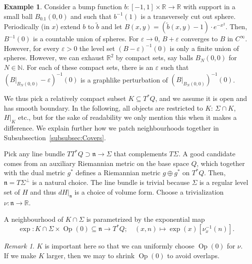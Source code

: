 \documentclass{amsart}
\newcommand{\NN}{\mathbb{N}}
\newcommand{\RR}{\mathbb{R}}
\newcommand{\Op}{\operatorname{Op}}
\theoremstyle{definition}
\newtheorem{example}[proposition]{Example}
\theoremstyle{remark}
\newtheorem{remark}[proposition]{Remark}
\numberwithin{equation}{section}
\begin{document}
\begin{example}\label{ex:InfiniteSpheres}
    Consider a bump function $b:[-1,1]\times \RR \to\RR$ with support in a small ball $B_{0.1}(0,0)$ and such that $b^{-1}(1)$ is a transversely cut out sphere. Periodically (in $x$) extend $b$ to $\tilde b$ and let $B(x,y)=(\tilde b(x,y)-1)\cdot e^{-x^2}$. Then, $B^{-1}(0)$ is a countable union of spheres. For $\varepsilon\to 0$, $B+\varepsilon$ converges to $B$ in $C^\infty$. However, for every $\varepsilon>0$ the level set $(B-\varepsilon)^{-1}(0)$ is only a finite union of spheres. However, we can exhaust $\RR^2$ by compact sets, say balls $B_N(0,0)$ for $N\in \NN$. For each of these compact sets, there is an $\varepsilon$ such that $(B|_{B_N(0,0)}-\varepsilon)^{-1}(0)$ is a graphlike perturbation of $(B|_{B_N(0,0)})^{-1}(0)$. 
\end{example}

We thus pick a relatively compact subset $K\subseteq T^*Q$, and we assume it is open and has smooth boundary. In the following, all objects are restricted to $K$: $\Sigma\cap K$, $H|_K$ etc., but for the sake of readability we only mention this when it makes a difference. We explain further how we patch neighbourhoods together in Subsubsection~\ref{subsubsec:Covers}.

Pick any line bundle $TT^*Q\supset\mathfrak n\to \Sigma$ that complements $T\Sigma$. A good candidate comes from an auxiliary Riemannian metric on the base space $Q$, which together with the dual metric $g^*$ defines a Riemannian metric $g\oplus g^*$ on $T^*Q$. Then, $\mathfrak n=T\Sigma^\perp$ is a natural choice. The line bundle is trivial because $\Sigma$ is a regular level set of $H$ and thus $dH|_{\mathfrak n}$ is a choice of volume form. Choose a trivialization $\nu:\mathfrak n\to \RR$. 

A neighbourhood of $K\cap\Sigma$ is parametrized by the exponential map
$$\exp: K\cap\Sigma\times \Op(0)\subseteq \mathfrak n \to T^*Q;\quad (x,n)\mapsto \exp(x)[\nu^{-1}_x(n)].$$
\begin{remark}
    $K$ is important here so that we can uniformly choose $\Op(0)$ for $\nu$. If we make $K$ larger, then we may to shrink $\Op(0)$ to avoid overlaps. 
\end{remark}
\end{document}
